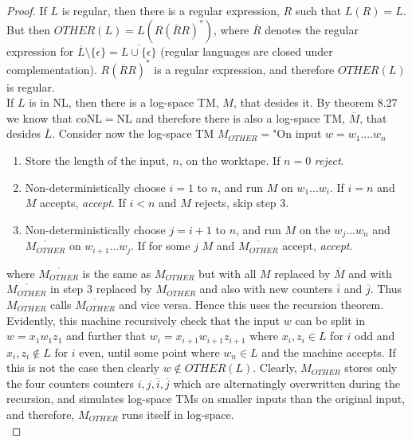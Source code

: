 \documentclass[a4paper,11pt]{article}
\numberwithin{equation}{section}
\begin{document}
	\begin{proof}
		If $ L $ is regular, then there is a regular expression, $ R $ such that $ L(R)=L $. But then $ OTHER(L)=L(R(\overline{R}R)^*) $, where $ \overline{R} $ denotes the regular expression for $ \overline{L}\setminus\{\epsilon\}=\overline{L\cup \{\epsilon\}} $ (regular languages are closed under complementation). $ R(\overline{R}R)^* $ is a regular expression, and therefore $ OTHER(L) $ is regular.\\
		If $ L $ is in NL, then there is a log-space TM, $ M $, that desides it. By theorem 8.27 we know that coNL$ = $NL and therefore there is also a log-space TM, $ \overline{M} $, that desides $ \overline{L} $. Consider now the log-space TM $ M_{OTHER}= $"On input $ w=w_1....w_n $
		\begin{enumerate}
			\item Store the length of the input, $ n $, on the worktape. If $ n=0 $ \emph{reject}.
			\item Non-deterministically choose $ i=1 $ to $ n $, and run $ M $ on $w_1...w_i $. If $ i=n $ and $ M $ accepts, \emph{accept}. If $ i<n $ and $ M $ rejects, skip step 3.
			\item \begin{addmargin}[2em]{0em}
				Non-deterministically choose $ j=i+1 $ to $ n $, and run $ M $ on the $ w_j...w_n $ and $ \overline{M_{OTHER}} $ on $ w_{i+1}...w_j $. If for some $ j $ $ M $ and $ \overline{M_{OTHER}} $ accept, \emph{accept}.
			\end{addmargin} 
		\end{enumerate}
		where $ \overline{M_{OTHER}} $ is the same as $ M_{OTHER} $ but with all $ M $ replaced by $ \overline{M} $ and with  $ \overline{M_{OTHER}} $ in step $ 3 $ replaced by $ M_{OTHER} $ and also with new counters $ \overline{i} $ and $ \overline{j} $. Thus $ M_{OTHER} $ calls $ \overline{ M_{OTHER} } $ and vice versa. Hence this uses the recursion theorem.
		Evidently, this machine recursively check that the input $ w $ can be split in $ w=x_1w_1z_1 $ and further that $ w_i=x_{i+1}w_{i+1}z_{i+1} $ where $ x_i,z_i\in L $ for $ i $ odd and $ x_i,z_i\notin L  $ for $ i $ even, until some point where $ w_n\in L $ and the machine accepts. If this is not the case then clearly $ w\notin OTHER(L) $. Clearly, $ M_{OTHER} $ stores only the four counters counters $ i,j,\overline{i},\overline{j} $ which are alternatingly overwritten during the recursion, and simulates log-space TMs on smaller inputs than the original input, and therefore, $ M_{OTHER} $ runs itself in log-space.\\

\end{proof}
\end{document}
